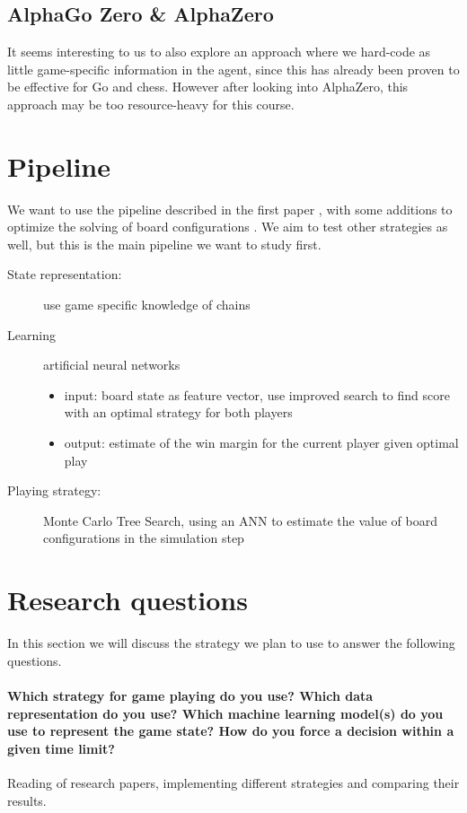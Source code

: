 \documentclass[11pt,a4paper]{article}
\begin{document}
	\subsection{AlphaGo Zero \cite{Wikipedia:AG_Zero} \& AlphaZero \cite{Wikipedia:AZero}}
	It seems interesting to us to also explore an approach where we hard-code as little game-specific information in the agent, since this has already been proven to be effective for Go and chess. However after looking into AlphaZero, this approach may be too resource-heavy for this course.
	
	\section{Pipeline}
	We want to use the pipeline described in the first paper \cite{7317912}, with some additions to optimize the solving of board configurations \cite{Barker:2012:SD:2900728.2900788}. We aim to test other strategies as well, but this is the main pipeline we want to study first.

	\begin{description}
		\item[State representation:] use game specific knowledge of chains
		\item[Learning] artificial neural networks
		\begin{itemize}
			\item input: board state as feature vector, use improved search to find score with an optimal strategy for both players
			\item output: estimate of the win margin for the current player given optimal play
		\end{itemize}
		\item[Playing strategy:] Monte Carlo Tree Search, using an ANN to estimate the value of board configurations in the simulation step
	\end{description}

	\section{Research questions}
	In this section we will discuss the strategy we plan to use to answer the following questions.
	\paragraph{Which strategy for game playing do you use? Which data representation do you use? Which machine learning model(s) do you use to represent the game state? How do you force a decision within a given time limit?} Reading of research papers, implementing different strategies and comparing their results.
\end{document}
